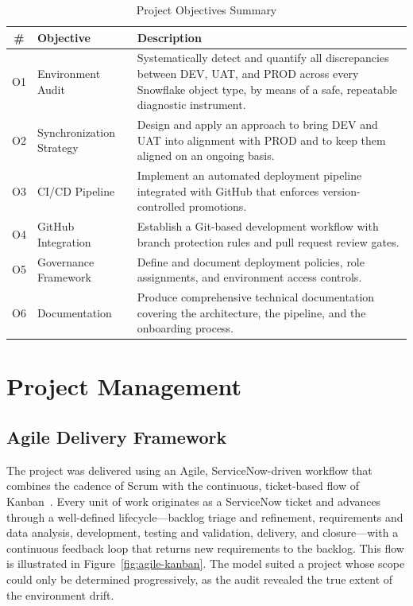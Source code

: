 \begin{table}[H]
  \centering
  \begin{tabularx}{\textwidth}{c l X}
    \toprule
    \rowcolor{ibmblue!15}
    \textbf{\#} & \textbf{Objective} & \textbf{Description} \\
    \midrule
    O1 & Environment Audit       & Systematically detect and quantify all discrepancies between DEV, UAT, and PROD across every Snowflake object type, by means of a safe, repeatable diagnostic instrument. \\
    O2 & Synchronization Strategy & Design and apply an approach to bring DEV and UAT into alignment with PROD and to keep them aligned on an ongoing basis. \\
    O3 & CI/CD Pipeline          & Implement an automated deployment pipeline integrated with GitHub that enforces version-controlled promotions. \\
    O4 & GitHub Integration      & Establish a Git-based development workflow with branch protection rules and pull request review gates. \\
    O5 & Governance Framework    & Define and document deployment policies, role assignments, and environment access controls. \\
    O6 & Documentation           & Produce comprehensive technical documentation covering the architecture, the pipeline, and the onboarding process. \\
    \bottomrule
  \end{tabularx}
  \caption{Project Objectives Summary}
  \label{tab:objectives}
\end{table}

\section{Project Management}
\label{sec:project-mgmt}

\subsection{Agile Delivery Framework}
\label{subsec:agile}

The project was delivered using an Agile, ServiceNow-driven workflow that combines the cadence of Scrum with the continuous, ticket-based flow of Kanban~\citep{schwaber2020scrum}. Every unit of work originates as a ServiceNow ticket and advances through a well-defined lifecycle---backlog triage and refinement, requirements and data analysis, development, testing and validation, delivery, and closure---with a continuous feedback loop that returns new requirements to the backlog. This flow is illustrated in Figure~\ref{fig:agile-kanban}. The model suited a project whose scope could only be determined progressively, as the audit revealed the true extent of the environment drift.

